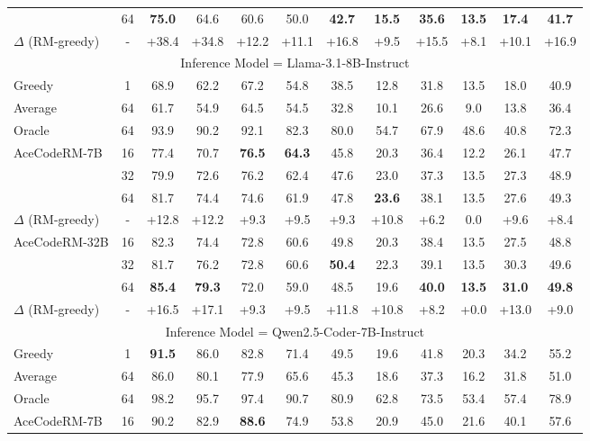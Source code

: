 \begin{table*}[!t]
{\begin{tabular}{lccccccccccc}
 & 64 & \textbf{75.0} & 64.6 & 60.6 & 50.0 & \textbf{42.7} & \textbf{15.5} & \textbf{35.6} & \textbf{13.5} & \textbf{17.4} & \textbf{41.7} \\
\rowcolor{LightCyan}
$\Delta$ (RM-greedy) & - & +38.4 & +34.8 & +12.2 & +11.1 & +16.8 & +9.5 & +15.5 & +8.1 & +10.1 & +16.9 \\
\midrule
\multicolumn{12}{c}{Inference Model = Llama-3.1-8B-Instruct} \\
 \midrule
Greedy & 1 & 68.9 & 62.2 & 67.2 & 54.8 & 38.5 & 12.8 & 31.8 & 13.5 & 18.0 & 40.9 \\
Average & 64 & 61.7 & 54.9 & 64.5 & 54.5 & 32.8 & 10.1 & 26.6 & 9.0 & 13.8 & 36.4 \\
Oracle & 64 & 93.9 & 90.2 & 92.1 & 82.3 & 80.0 & 54.7 & 67.9 & 48.6 & 40.8 & 72.3 \\
\midrule  
\multirow{3}{*}{AceCodeRM-7B} & 16 & 77.4 & 70.7 & \textbf{76.5} & \textbf{64.3} & 45.8 & 20.3 & 36.4 & 12.2 & 26.1 & 47.7 \\
 & 32 & 79.9 & 72.6 & 76.2 & 62.4 & 47.6 & 23.0 & 37.3 & 13.5 & 27.3 & 48.9 \\
 & 64 & 81.7 & 74.4 & 74.6 & 61.9 & 47.8 & \textbf{23.6} & 38.1 & 13.5 & 27.6 & 49.3 \\
\rowcolor{LightCyan}
 $\Delta$ (RM-greedy) & - & +12.8 & +12.2 & +9.3 & +9.5 & +9.3 & +10.8 & +6.2 & 0.0 & +9.6 & +8.4 \\
 \midrule
\multirow{3}{*}{AceCodeRM-32B} & 16 & 82.3 & 74.4 & 72.8 & 60.6 & 49.8 & 20.3 & 38.4 & 13.5 & 27.5 & 48.8 \\
 & 32 & 81.7 & 76.2 & 72.8 & 60.6 & \textbf{50.4} & 22.3 & 39.1 & 13.5 & 30.3 & 49.6 \\
 & 64 & \textbf{85.4} & \textbf{79.3} & 72.0 & 59.0 & 48.5 & 19.6 & \textbf{40.0} & \textbf{13.5} & \textbf{31.0} & \textbf{49.8} \\
\rowcolor{LightCyan}
$\Delta$ (RM-greedy) & - & +16.5 & +17.1 & +9.3 & +9.5 & +11.8 & +10.8 & +8.2 & +0.0 & +13.0 & +9.0 \\
\midrule
\multicolumn{12}{c}{Inference Model = Qwen2.5-Coder-7B-Instruct} \\
 \midrule
Greedy & 1 & \textbf{91.5} & 86.0 & 82.8 & 71.4 & 49.5 & 19.6 & 41.8 & 20.3 & 34.2 & 55.2 \\
Average & 64 & 86.0 & 80.1 & 77.9 & 65.6 & 45.3 & 18.6 & 37.3 & 16.2 & 31.8 & 51.0 \\
Oracle & 64 & 98.2 & 95.7 & 97.4 & 90.7 & 80.9 & 62.8 & 73.5 & 53.4 & 57.4 & 78.9 \\
\midrule
\multirow{3}{*}{AceCodeRM-7B} & 16 & 90.2 & 82.9 & \textbf{88.6} & 74.9 & 53.8 & 20.9 & 45.0 & 21.6 & 40.1 & 57.6 \\

\end{tabular}}
\end{table*}
